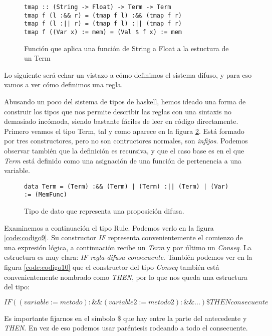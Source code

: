 \begin{figure}
\begin{lstlisting}
tmap :: (String -> Float) -> Term -> Term
tmap f (l :&& r) = (tmap f l) :&& (tmap f r)
tmap f (l :|| r) = (tmap f l) :|| (tmap f r)
tmap f ((Var x) := mem) = (Val $ f x) := mem
\end{lstlisting}
\caption{Función que aplica una función de String a Float a la
  estuctura de un Term}
\label{code:codigo7}
\end{figure}

Lo siguiente será echar un vistazo a cómo definimos el sistema difuso,
y para eso vamos a ver cómo definimos una regla.

Abusando un poco del sistema de tipos de haskell, hemos ideado una
forma de construir los tipos que nos permite describir las reglas con
una sintaxis no demasiado incómoda, siendo bastante fáciles de leer en
código directamente. Primero veamos el tipo Term, tal y como aparece
en la figura \ref{code:codigo8}. Está formado por tres constructores,
pero no son contructores normales, son \emph{infijos}. Podemos
observar también que la definición es recursiva, y que el caso base es
en el que \emph{Term} está definido como una asignación de una función
de pertenencia a una variable.

\begin{figure}
\begin{lstlisting}
data Term = (Term) :&& (Term) | (Term) :|| (Term) | (Var) := (MemFunc)
\end{lstlisting}
\caption{Tipo de dato que representa una proposición difusa.}
\label{code:codigo8}
\end{figure}

Examinemos a continuación el tipo Rule. Podemos verlo en la figura
\ref{code:codigo9}. Su constructor \emph{IF} representa
convenientemente el comienzo de una expresión lógica, a continuación
recibe un \emph{Term} y por último un \emph{Conseq}. La estructura es
muy clara: \emph{IF regla-difusa consecuente}. También podemos ver en
la figura \ref{code:codigo10} que el constructor del tipo
\emph{Conseq} también está convenientemente nombrado como \emph{THEN},
por lo que nos queda una estructura del tipo:

\begin{equation}
IF ((variable := metodo) :\&\& (variable2 := metodo2) :\&\& ...) \$
THEN consecuente 
\end{equation}

Es importante fijarnos en el símbolo \$ que hay entre la parte del
antecedente y \emph{THEN}. En vez de eso podemos usar paréntesis
rodeando a todo el consecuente.

